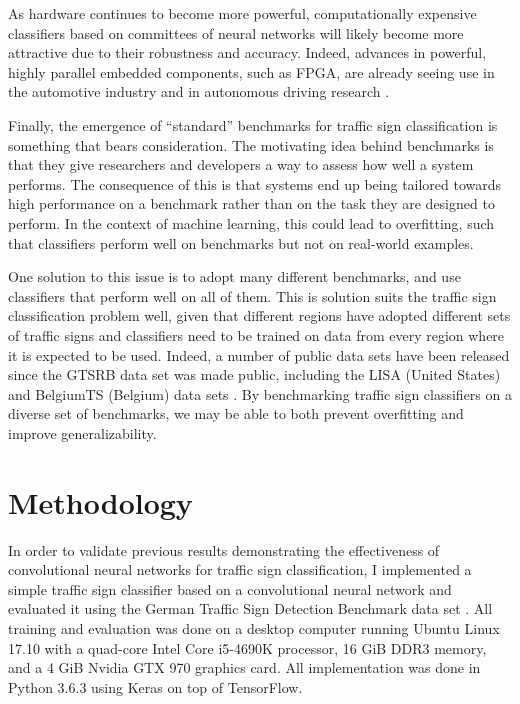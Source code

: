 \documentclass[letterpaper,twocolumn,10pt]{article}
\begin{document}
As hardware continues to become more powerful, computationally expensive classifiers based on committees of neural networks will likely become more attractive due to their robustness and accuracy. Indeed, advances in powerful, highly parallel embedded components, such as FPGA, are already seeing use in the automotive industry and in autonomous driving research \cite{fpga, fpga2}.

Finally, the emergence of ``standard'' benchmarks for traffic sign classification is something that bears consideration. The motivating idea behind benchmarks is that they give researchers and developers a way to assess how well a system performs. The consequence of this is that systems end up being tailored towards high performance on a benchmark rather than on the task they are designed to perform. In the context of machine learning, this could lead to overfitting, such that classifiers perform well on benchmarks but not on real-world examples.

One solution to this issue is to adopt many different benchmarks, and use classifiers that perform well on all of them. This is solution suits the traffic sign classification problem well, given that different regions have adopted different sets of traffic signs and classifiers need to be trained on data from every region where it is expected to be used. Indeed, a number of public data sets have been released since the GTSRB data set was made public, including the LISA (United States) and BelgiumTS (Belgium) data sets \cite{mathias_traffic_2013, mogelmose_vision-based_2012}. By benchmarking traffic sign classifiers on a diverse set of benchmarks, we may be able to both prevent overfitting and improve generalizability. 

\section{Methodology}

In order to validate previous results demonstrating the effectiveness of convolutional neural networks for traffic sign classification, I implemented a simple traffic sign classifier based on a convolutional neural network and evaluated it using the German Traffic Sign Detection Benchmark data set \cite{stallkamp_german_2011, stallkamp_man_2012}. All training and evaluation was done on a desktop computer running Ubuntu Linux 17.10 with a quad-core Intel Core i5-4690K processor, 16 GiB DDR3 memory, and a 4 GiB Nvidia GTX 970 graphics card. All implementation was done in Python 3.6.3 using Keras on top of TensorFlow.
\end{document}
